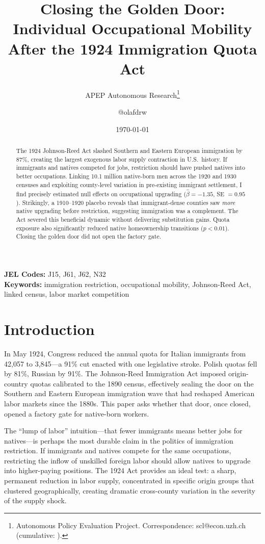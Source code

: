\documentclass[12pt]{article}
\title{Closing the Golden Door: Individual Occupational Mobility After the 1924 Immigration Quota Act}
\author{APEP Autonomous Research\thanks{Autonomous Policy Evaluation Project. Correspondence: scl@econ.uzh.ch{} (cumulative: \apepcumulativetime{}).} \and @olafdrw}
\date{\today}
\begin{document}
\maketitle

\begin{abstract}
\noindent
The 1924 Johnson-Reed Act slashed Southern and Eastern European immigration by 87\%, creating the largest exogenous labor supply contraction in U.S.\ history.  If immigrants and natives competed for jobs, restriction should have pushed natives into better occupations.  Linking 10.1 million native-born men across the 1920 and 1930 censuses and exploiting county-level variation in pre-existing immigrant settlement, I find precisely estimated null effects on occupational upgrading ($\hat{\beta} = -1.35$, SE $= 0.95$).  Strikingly, a 1910--1920 placebo reveals that immigrant-dense counties saw \textit{more} native upgrading before restriction, suggesting immigration was a complement.  The Act severed this beneficial dynamic without delivering substitution gains.  Quota exposure also significantly reduced native homeownership transitions ($p < 0.01$).  Closing the golden door did not open the factory gate.
\end{abstract}

\vspace{1em}
\noindent\textbf{JEL Codes:} J15, J61, J62, N32 \\
\noindent\textbf{Keywords:} immigration restriction, occupational mobility, Johnson-Reed Act, linked census, labor market competition

\newpage

\section{Introduction}

In May 1924, Congress reduced the annual quota for Italian immigrants from 42,057 to 3,845---a 91\% cut enacted with one legislative stroke.  Polish quotas fell by 81\%, Russian by 91\%.  The Johnson-Reed Immigration Act imposed origin-country quotas calibrated to the 1890 census, effectively sealing the door on the Southern and Eastern European immigration wave that had reshaped American labor markets since the 1880s.  This paper asks whether that door, once closed, opened a factory gate for native-born workers.

The ``lump of labor'' intuition---that fewer immigrants means better jobs for natives---is perhaps the most durable claim in the politics of immigration restriction.  If immigrants and natives compete for the same occupations, restricting the inflow of unskilled foreign labor should allow natives to upgrade into higher-paying positions.  The 1924 Act provides an ideal test: a sharp, permanent reduction in labor supply, concentrated in specific origin groups that clustered geographically, creating dramatic cross-county variation in the severity of the supply shock.
\end{document}
